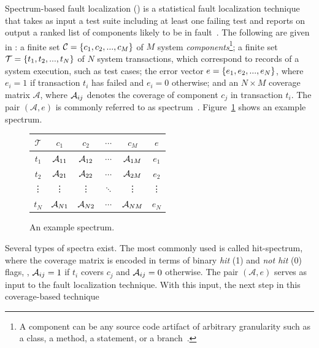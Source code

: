 \documentclass[sigplan,10pt,review,anonymous]{acmart}\settopmatter{printfolios=true,printccs=false,printacmref=false}
\begin{document}
Spectrum-based fault localization (\sfl) is a statistical fault
localization technique that takes as input a test suite including at
least one failing test and reports on output a ranked list of
components likely to be in fault~\cite{FLSurvey2016,
  DBLP:conf/kbse/JonesH05, DBLP:journals/smr/LuciaLJTB14,
  DBLP:journals/jss/AbreuZGG09}. The following are given in \sfl{}: a
finite set $\mathcal{C} = \{{}c_1,c_2,...,c_M\}$ of $M$ system
\emph{components}\footnote{A component can be any source code artifact
  of arbitrary granularity such as a class, a method, a statement, or
  a branch~\cite{DBLP:journals/stvr/HarroldRSWY00}.}; a finite set
$\mathcal{T} = \{{}t_1,t_2,...,t_N\}$ of $N$ system transactions,
which correspond to records of a system execution, such as test cases;
the error vector $e = \{{}e_1,e_2,...,e_N\}$, where $e_i = 1$ if
transaction $t_i$ has failed and $e_i = 0$ otherwise; and an $N \times
M$ coverage matrix $\mathcal{A}$, where $\mathcal{A}_{ij}$ denotes the coverage
of component $c_j$ in transaction $t_i$.  The pair $(\mathcal{A},e)$
is commonly referred to as
spectrum~\cite{DBLP:journals/stvr/HarroldRSWY00}. Figure~\ref{fig:spectrum-example}
shows an example spectrum.
\begin{figure}
  \vspace{-2ex}
  \hspace{-3ex}
  \centering
  \small
  \begin{tabular}{c|cccc|c}
    $\mathcal{T}$ & $c_1$    & $c_2$    & $\cdots$ & $c_M$    & $e$    \\ \hline
    $t_1$         & $\mathcal{A}_{11}$ & $\mathcal{A}_{12}$ & $\cdots$ & $\mathcal{A}_{1M}$ & $e_1$  \\
    $t_2$         & $\mathcal{A}_{21}$ & $\mathcal{A}_{22}$ & $\cdots$ & $\mathcal{A}_{2M}$ & $e_2$  \\
    \vdots        & \vdots   & \vdots   & $\ddots$ & \vdots   & \vdots \\
    $t_N$         & $\mathcal{A}_{N1}$ & $\mathcal{A}_{N2}$ & $\cdots$ & $\mathcal{A}_{NM}$ & $e_N$  \\
  \end{tabular}
  \caption{An example spectrum.}
  \label{fig:spectrum-example}
\end{figure}
Several types of spectra exist.  The most commonly used is called
hit-spectrum, where the coverage matrix is encoded in terms of binary
\emph{hit} (1) and \emph{not hit} (0) flags, \ie{}, $\mathcal{A}_{ij} = 1$ if
$t_i$ covers $c_j$ and $\mathcal{A}_{ij} = 0$ otherwise.  The pair
$(\mathcal{A},e)$ serves as input to the fault localization technique.
With this input, the next step in this coverage-based technique
\end{document}
